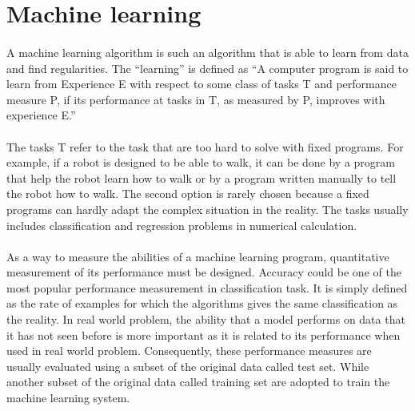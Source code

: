 \section{Machine learning}
\paragraph{}
A machine learning algorithm is such an algorithm that is able to learn from data and find regularities.
The ``learning'' is defined as ``A computer program is said to learn from Experience E with respect to some class of tasks T and performance measure P, if its performance at tasks in T, as measured by P, improves with experience E.'' \cite{Mitchell:1997:ML:541177}
\paragraph{}
The tasks T refer to the task that are too hard to solve with fixed programs.
For example, if a robot is designed to be able to walk, it can be done by a program that help the robot learn how to walk or by a program written manually to tell the robot how to walk.
The second option is rarely chosen because a fixed programs can hardly adapt the complex situation in the reality.
The tasks usually includes classification and regression problems in numerical calculation.

\paragraph{}
As a way to measure the abilities of a machine learning program, quantitative measurement of its performance must be designed.
Accuracy could be one of the most popular performance measurement in classification task.
It is simply defined as the rate of examples for which the algorithms gives the same classification as the reality.
In real world problem, the ability that a model performs on data that it has not seen before is more important as it is related to its performance when used in real world problem.
Consequently, these performance measures are usually evaluated using a subset of the original data called test set.
While another subset of the original data called training set are adopted to train the machine learning system.

